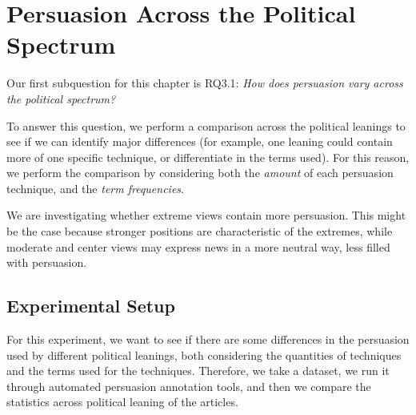 \section{\statusgreen Persuasion Across the Political Spectrum}
\label{ssec:ps_prop_leaning_across}

Our first subquestion for this chapter is RQ3.1: \emph{How does persuasion vary across the political spectrum?}

To answer this question, we perform a comparison across the political leanings to see if we can identify major differences (for example, one leaning could contain more of one specific technique, or differentiate in the terms used).
For this reason, we perform the comparison by considering both the \emph{amount} of each persuasion technique, and the \emph{term frequencies}.



We are investigating whether extreme views contain more persuasion.
This might be the case because stronger positions are characteristic of the extremes, while moderate and center views may express news in a more neutral way, less filled with persuasion.

\subsection{Experimental Setup}

For this experiment, we want to see if there are some differences in the persuasion used by different political leanings, both considering the quantities of techniques and the terms used for the techniques.
Therefore, we take a dataset, we run it through automated persuasion annotation tools, and then we compare the statistics across political leaning of the articles.

